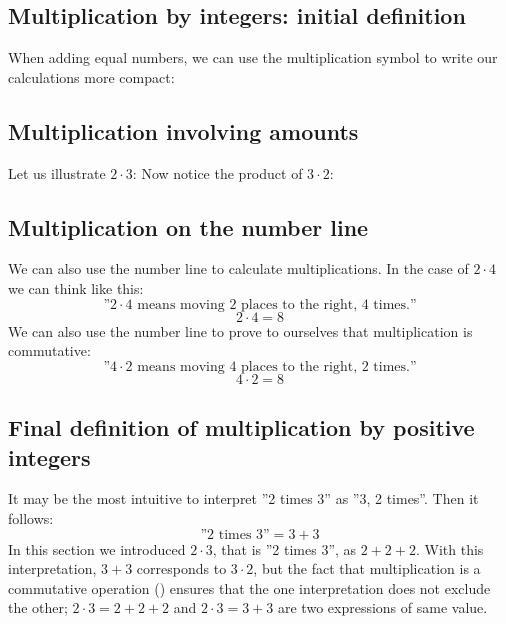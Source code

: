 \subsection*{Multiplication by integers: initial definition }
When adding equal numbers, we can use the multiplication symbol \sym{$ \cdot $}\; to write our calculations more compact: \regv
{} \regv
{}
\subsection*{Multiplication involving amounts}
Let us illustrate $ 2\cdot3 $:
Now notice the product of $ 3\cdot 2 $:
\reg[\gangkom \label{gangkom}]{
	The order of the factors has no impact on the product.
}

\subsection*{Multiplication on the number line}
We can also use the number line to calculate multiplications. In the case of $ 2\cdot4 $ we can think like this:
\[\text{''} 2\cdot 4 \text{ means moving 2 places to the right, 4 times.}\text{''} \]
\[ 2\cdot4=8 \]
We can also use the number line to prove to ourselves that multiplication is commutative:
\[\text{''} 4\cdot 2 \text{ means moving 4 places to the right, 2 times.}\text{''} \]
\[ 4\cdot2=8 \]


\subsection*{Final definition of multiplication by positive integers}
It may be the most intuitive to interpret ''2 times 3'' as ''3, 2 times''. Then it follows:
\[ \text{''2 times 3''}=3+3 \]
In this section we introduced $ {2\cdot3} $, that is ''2 times 3'', as $ {2+2+2} $. With this interpretation, $ {3+3} $ corresponds to $ {3\cdot2} $, but the fact that multiplication is a commutative operation () ensures that the one interpretation does not exclude the other; $ {2\cdot3 =2+2+2} $ and $ {2\cdot3=3+3} $ are two expressions of same value.\regv

